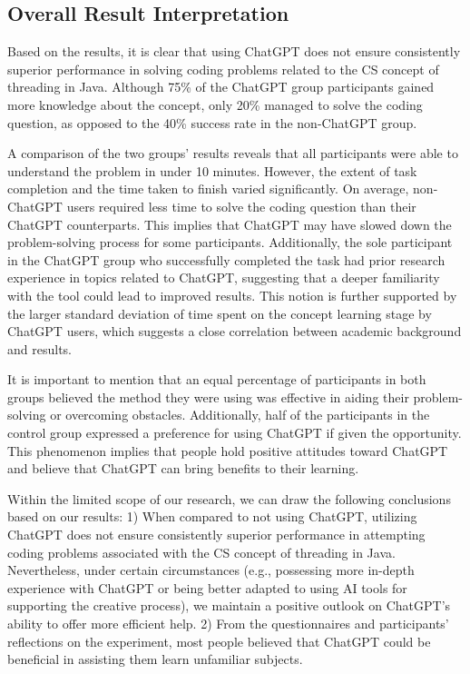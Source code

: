 \documentclass[manuscript,screen,nonacm]{acmart}
\begin{document}
\subsection{Overall Result Interpretation}\label{interpretation}
Based on the results, it is clear that using ChatGPT does not ensure consistently superior performance in solving coding problems related to the CS concept of threading in Java. Although 75\% of the ChatGPT group participants gained more knowledge about the concept, only 20\% managed to solve the coding question, as opposed to the 40\% success rate in the non-ChatGPT group.

A comparison of the two groups' results reveals that all participants were able to understand the problem in under 10 minutes. However, the extent of task completion and the time taken to finish varied significantly. On average, non-ChatGPT users required less time to solve the coding question than their ChatGPT counterparts. This implies that ChatGPT may have slowed down the problem-solving process for some participants. Additionally, the sole participant in the ChatGPT group who successfully completed the task had prior research experience in topics related to ChatGPT, suggesting that a deeper familiarity with the tool could lead to improved results. This notion is further supported by the larger standard deviation of time spent on the concept learning stage by ChatGPT users, which suggests a close correlation between academic background and results.

It is important to mention that an equal percentage of participants in both groups believed the method they were using was effective in aiding their problem-solving or overcoming obstacles. Additionally, half of the participants in the control group expressed a preference for using ChatGPT if given the opportunity. This phenomenon implies that people hold positive attitudes toward ChatGPT and believe that ChatGPT can bring benefits to their learning.

Within the limited scope of our research, we can draw the following conclusions based on our results: 1) When compared to not using ChatGPT, utilizing ChatGPT does not ensure consistently superior performance in attempting coding problems associated with the CS concept of threading in Java. Nevertheless, under certain circumstances (e.g., possessing more in-depth experience with ChatGPT or being better adapted to using AI tools for supporting the creative process), we maintain a positive outlook on ChatGPT's ability to offer more efficient help. 2) From the questionnaires and participants' reflections on the experiment, most people believed that ChatGPT could be beneficial in assisting them learn unfamiliar subjects.
\end{document}
